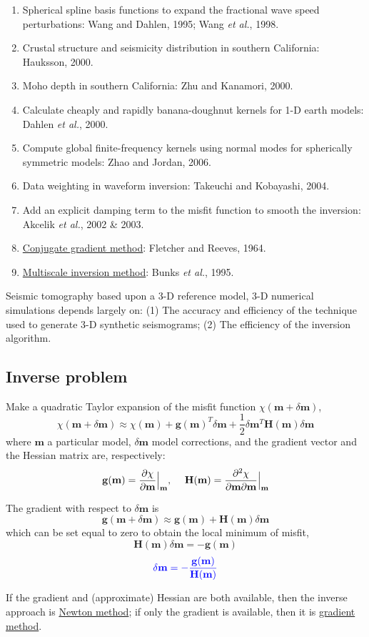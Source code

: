 \documentclass{article}
\newcommand{\mbf}[1]{\mathbf{#1}}
\newcommand{\myem}[1]{{\color{red}\uline{#1}}}
\newcommand{\myno}[1]{{\color{blue}#1}}
\newcommand{\etal}{\textit{et al.}}
\begin{document}
\begin{enumerate}[\hspace{10mm*}]
  \item Spherical spline basis functions to expand the fractional wave speed perturbations: Wang and Dahlen, 1995; Wang \etal, 1998.
  \item Crustal structure and seismicity distribution in southern California: Hauksson, 2000.
  \item Moho depth in southern California: Zhu and Kanamori, 2000.
  \item Calculate cheaply and rapidly banana-doughnut kernels for 1-D earth models: Dahlen \etal, 2000.
  \item Compute global finite-frequency kernels using normal modes for spherically symmetric models: Zhao and Jordan, 2006.
  \item Data weighting in waveform inversion: Takeuchi and Kobayashi, 2004.
  \item Add an explicit damping term to the misfit function to smooth the inversion: Akcelik \etal, 2002 \& 2003.
  \item \myem{Conjugate gradient method}: Fletcher and Reeves, 1964.
  \item \myem{Multiscale inversion method}: Bunks \etal, 1995.
\end{enumerate}\par
Seismic tomography based upon a 3-D reference model, 3-D numerical simulations depends largely on: (1) The accuracy and efficiency of the technique used to generate 3-D synthetic seismograms; (2) The efficiency of the inversion algorithm.\par
\subsection{Inverse problem}
Make a quadratic Taylor expansion of the misfit function $\chi(\mbf m+\delta\mbf m)$,
\[ \chi(\mbf m+\delta\mbf m)\approx\chi(\mbf m)+\mbf g(\mbf m)^T\delta\mbf m+\frac{1}{2}\delta\mbf m^T\mbf H(\mbf m)\delta\mbf m \]
where $\mbf m$ a particular model, $\delta\mbf m$ model corrections, and the gradient vector and the Hessian matrix are, respectively:
\[ \mbf g(\mbf m)=\frac{\partial\chi}{\partial\mbf m}\Big|_{\mbf m} \text{,\hspace{5mm}} \mbf H(\mbf m)=\frac{\partial^2\chi}{\partial\mbf m\partial\mbf m}\Big|_{\mbf m} \]\par
The gradient with respect to $\delta\mbf m$ is
\[ \mbf g(\mbf m+\delta\mbf m)\approx\mbf g(\mbf m)+\mbf H(\mbf m)\delta\mbf m \]
which can be set equal to zero to obtain the local minimum of misfit,
\[ \mbf H(\mbf m)\delta\mbf m=-\mbf g(\mbf m) \]
\[ \myno{\delta\mbf m=-\frac{\mbf g(\mbf m)}{\mbf H(\mbf m)}} \]\par
If the gradient and (approximate) Hessian are both available, then the inverse approach is \myem{Newton method}; if only the gradient is available, then it is \myem{gradient method}.\par
\end{document}

